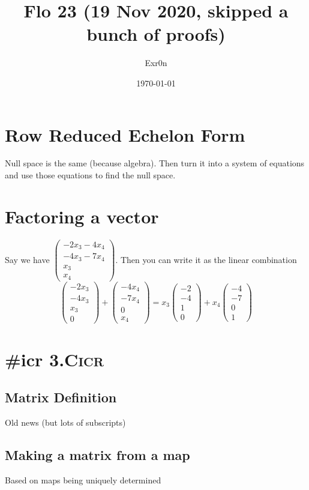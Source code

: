 \documentclass[letterpaper]{article}
\author{Exr0n}
\date{\today}
\title{Flo 23 (19 Nov 2020, skipped a bunch of proofs)}
\renewcommand{\tableofcontents}{}
\begin{document}
\tableofcontents


\section{Row Reduced Echelon Form}
\label{sec:orge29a932}
Null space is the same (because algebra).
Then turn it into a system of equations and use those equations to find the null space.

\section{Factoring a vector}
\label{sec:org9911c62}
Say we have \(\begin{pmatrix}-2x_3-4x_4\\-4x_3-7x_4\\x_3\\x_4\end{pmatrix}\).
Then you can write it as the linear combination $$\begin{pmatrix}-2x_3\\-4x_3\\x_3\\0\end{pmatrix}+\begin{pmatrix}-4x_4\\-7x_4\\0\\x_4\end{pmatrix} = x_3\begin{pmatrix}-2\\-4\\1\\0\end{pmatrix}+x_4\begin{pmatrix}-4\\-7\\0\\1\end{pmatrix}$$

\section{\#icr 3.C\hfill{}\textsc{icr}}
\label{sec:orgac7eccd}

\subsection{Matrix Definition}
\label{sec:org0c1babf}
Old news (but lots of subscripts)

\subsection{Making a matrix from a map}
\label{sec:orgbcdfd9a}
Based on maps being uniquely determined
\end{document}
